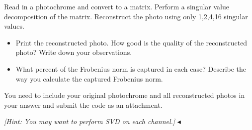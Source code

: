﻿\documentclass[11pt]{article}
\newenvironment{problem}[2][Problem]{\begin{trivlist}
\item[\hskip \labelsep {\bfseries #1}\hskip \labelsep {\bfseries #2.}]}{\hfill$\blacktriangleleft$\end{trivlist}}
\begin{document}
\begin{problem}{7 (10')}
Read in a photochrome and convert to a matrix. Perform a singular value decomposition of the matrix. Reconstruct the photo using only 1,2,4,16 singular values.
\begin{itemize}
    \item [(1)] Print the reconstructed photo. How good is the quality of the reconstructed photo? Write down your observations.
    \item [(2)] What percent of the Frobenius norm is captured in each case? Describe the way you calculate the captured Frobenius norm.
\end{itemize}

You need to include your original photochrome and all reconstructed photos in your answer and submit the code as an attachment.

\textit{[Hint: You may want to perform SVD on each channel.]}
\end{problem}
\end{document}

